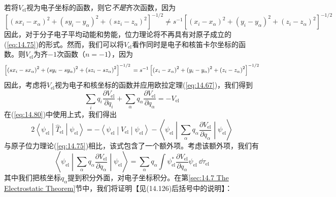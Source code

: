     若将$V_{\text{el}}$视为电子坐标的函数，则它\textit{不是}齐次函数，因为
    \begin{equation*}
        \left[\left(s x_i - x_{\alpha}\right)^2 + \left(sy_i - y_{\alpha}\right)^2 + \left(sz_i - z_{\alpha}\right)^2\right]^{-1/2} \neq s^{-1} \left[\left(x_i - x_{\alpha}\right)^2 + \left(y_i - y_{\alpha}\right)^2 + \left(z_i - z_{\alpha}\right)^2\right]^{-1/2}
    \end{equation*}
    因此，对于分子电子平均动能和势能，位力理论将不再具有对原子成立的(\ref{eq:14.75})的形式。然而，我们可以将$V_{\text{el}}$看作同时是电子和核笛卡尔坐标的函数。则$V_{\text{el}}$为齐$-1$次函数（$n=-1$），因为
    \begin{equation*}
            \left[\left(sx_i - sx_{\alpha}\right)^2 + \left(sy_i - sy_{\alpha}\right)^2 + \left(sz_i - sz_{\alpha}\right)^2\right]^{-1/2} \\
            = s^{-1} \left[\left(x_i - x_{\alpha}\right)^2 + \left(y_i - y_{\alpha}\right)^2 + \left(z_i - z_{\alpha}\right)^2\right]^{-1/2}
    \end{equation*}
    因此，考虑将$V_{\text{el}}$视为电子和核坐标的函数并应用欧拉定理(\ref{eq:14.67})，我们得到
    \begin{equation*}
        \sum_i q_i \frac{\partial V_{\text{el}}}{\partial q_i} + \sum_{\alpha} q_{\alpha} \frac{\partial V_{\text{el}}}{\partial q_{\alpha}} = -V_{\text{el}}
    \end{equation*}
    在(\ref{eq:14.80})中使用上式，我们得出
    \begin{equation}
        2 \left\langle \psi_{\text{el}} \middle| \hat{T}_{\text{el}} \middle| \psi_{\text{el}} \right\rangle = -\left\langle \psi_{\text{el}} \middle| V_{\text{el}} \middle| \psi_{\text{el}} \right\rangle - \left\langle \psi_{\text{el}} \middle| \sum_{\alpha} q_{\alpha} \frac{\partial V_{\text{el}}}{\partial q_{\alpha}} \middle| \psi_{\text{el}} \right\rangle
        \label{eq:14.81}
    \end{equation}
    与原子位力理论(\ref{eq:14.75})相比，该式包含了一个额外项。考虑该额外项，我们有
    \begin{equation*}
        \left\langle \psi_{\text{el}} \middle| \sum_{\alpha} q_{\alpha} \frac{\partial V_{\text{el}}}{\partial q_{\alpha}} \middle| \psi_{\text{el}} \right\rangle = \sum_{\alpha} q_{\alpha} \int \psi_{\text{el}}^* \frac{\partial V_{\text{el}}}{\partial q_{\alpha}} \psi_{\text{el}}\:\dd \tau_{\text{el}}
    \end{equation*}
    其中我们把核坐标$q_{\alpha}$提到积分外面，对电子坐标积分。在第\ref{sec:14.7 The Electrostatic Theorem}节中，我们将证明【见(14.126)后括号中的说明】：
